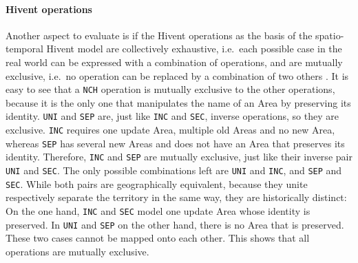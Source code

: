 
\paragraph{Hivent operations} %
\label{par:hivent_operations}

Another aspect to evaluate is if the Hivent operations as the basis of the spatio-temporal Hivent model are collectively exhaustive, i.e.\ each possible case in the real world can be expressed with a combination of operations, and are mutually exclusive, i.e.\ no operation can be replaced by a combination of two others \cite{mece}. It is easy to see that a \texttt{NCH} operation is mutually exclusive to the other operations, because it is the only one that manipulates the name of an Area by preserving its identity. \texttt{UNI} and \texttt{SEP} are, just like \texttt{INC} and \texttt{SEC}, inverse operations, so they are exclusive. \texttt{INC} requires one update Area, multiple old Areas and no new Area, whereas \texttt{SEP} has several new Areas and does not have an Area that preserves its identity. Therefore, \texttt{INC} and \texttt{SEP} are mutually exclusive, just like their inverse pair \texttt{UNI} and \texttt{SEC}.
The only possible combinations left are \texttt{UNI} and \texttt{INC}, and \texttt{SEP} and \texttt{SEC}. While both pairs are geographically equivalent, because they unite respectively separate the territory in the same way, they are historically distinct: On the one hand, \texttt{INC} and \texttt{SEC} model one update Area whose identity is preserved. In \texttt{UNI} and \texttt{SEP} on the other hand, there is no Area that is preserved. These two cases cannot be mapped onto each other. This shows that all operations are mutually exclusive.



